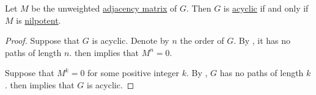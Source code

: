 \begin{proposition}\label{thm:nilpotent_adjacency_matrix}
  Let \( M \) be the unweighted \hyperref[def:graph_adjacency_matrix]{adjacency matrix} of \( G \). Then \( G \) is \hyperref[def:acyclic_graph]{acyclic} if and only if \( M \) is \hyperref[def:nilradical]{nilpotent}.
\end{proposition}
\begin{proof}
  \SufficiencySubProof* Suppose that \( G \) is acyclic. Denote by \( n \) the order of \( G \). By , it has no paths of length \( n \).  then implies that \( M^n = 0 \).

  \NecessitySubProof* Suppose that \( M^k = 0 \) for some positive integer \( k \). By , \( G \) has no paths of length \( k \).  then implies that \( G \) is acyclic.
\end{proof}

